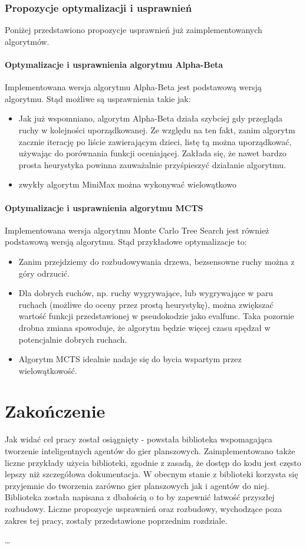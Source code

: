 \documentclass[polish,shortabstract,inz]{iithesis}
\begin{document}
\subsection{Propozycje optymalizacji i usprawnień}
Poniżej przedstawiono propozycje usprawnień już zaimplementowanych algorytmów.

\subsubsection{Optymalizacje i usprawnienia algorytmu Alpha-Beta}
Implementowana wersja algorytmu Alpha-Beta jest podstawową wersją algorytmu.
Stąd możliwe są usprawnienia takie jak:
\begin{itemize}
  \item Jak już wspomniano, algorytm Alpha-Beta działa szybciej gdy przegląda ruchy w kolejności uporządkowanej.
    Ze względu na ten fakt, zanim algorytm zacznie iterację po liście zawierającym dzieci, listę tą można uporządkować, używając do porównania funkcji oceniającej.
    Zakłada się, że nawet bardzo prosta heurystyka powinna zauważalnie przyśpieszyć działanie algorytmu.
  \item zwykły algorytm MiniMax można wykonywać wielowątkowo
\end{itemize}

\subsubsection{Optymalizacje i usprawnienia algorytmu MCTS}
Implementowana wersja algorytmu Monte Carlo Tree Search jest również podstawową wersją algorytmu.
Stąd przykładowe optymalizacje to:

\begin{itemize}
  \item Zanim przejdziemy do rozbudowywania drzewa, bezsensowne ruchy można z góry odrzucić.
  \item Dla dobrych ruchów, np. ruchy wygrywające, lub wygrywające w paru ruchach (możliwe do oceny przez prostą heurystykę), można zwiększać wartość funkcji przedstawionej w pseudokodzie jako eval\textunderscore func. Taka pozornie drobna zmiana spowoduje, że algorytm będzie więcej czasu spędzał w potencjalnie dobrych ruchach.
  \item Algorytm MCTS idealnie nadaje się do bycia wspartym przez wielowątkowość.
\end{itemize}

\chapter{Zakończenie}
Jak widać cel pracy został osiągnięty - powstała biblioteka wspomagająca tworzenie inteligentnych agentów do gier planszowych.
Zaimplementowano także liczne przykłady użycia biblioteki, zgodnie z zasadą, że dostęp do kodu jest często lepszy niż szczegółowa dokumentacja.
W obecnym stanie z biblioteki korzysta się przyjemnie do tworzenia zarówno gier planszowych jak i agentów do niej.
Biblioteka została napisana z dbałością o to by zapewnić łatwość przyszłej rozbudowy.
Liczne propozycje usprawnień oraz rozbudowy, wychodzące poza zakres tej pracy, zostały przedstawione poprzednim rozdziale.



\begin{thebibliography}{1}
 \ldots
\end{thebibliography}
\end{document}
